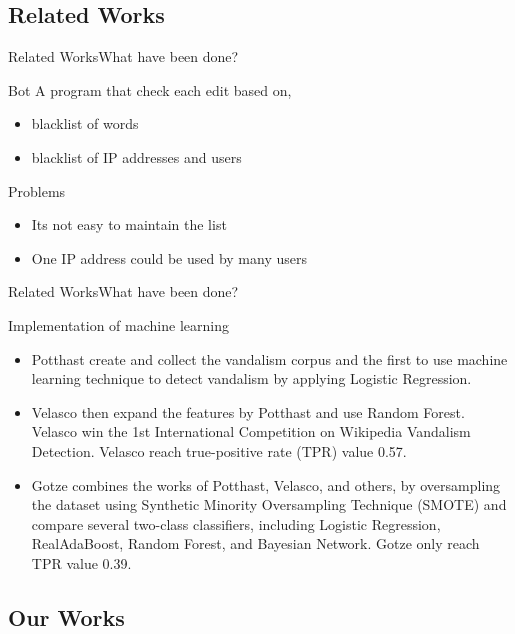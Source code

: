 \documentclass{beamer}
\begin{document}
\subsection{Related Works}

\begin{frame}{Related Works}{What have been done?}
	\begin{block}{Bot}
		A program that check each edit based on,
		\begin{itemize}
		\item blacklist of words
		\item blacklist of IP addresses and users
		\end{itemize}
	\end{block}
	\pause
	\begin{alertblock}{Problems}
		\begin{itemize}
		\item Its not easy to maintain the list
		\item One IP address could be used by many users
		\end{itemize}
	\end{alertblock}
\end{frame}

\begin{frame}{Related Works}{What have been done?}
	\begin{block}{Implementation of machine learning}
		\begin{itemize}
		\item Potthast create and collect the vandalism corpus and the first to
		use machine learning technique to detect vandalism by applying Logistic
		Regression.
		\item Velasco then expand the features by Potthast and use Random
		Forest. Velasco win the 1st International Competition on Wikipedia
		Vandalism Detection. Velasco reach true-positive rate (TPR) value 0.57.
		\item Gotze combines the works of Potthast, Velasco, and others,
		by oversampling the dataset using Synthetic Minority Oversampling
		Technique (SMOTE) and compare several two-class classifiers, including
		Logistic Regression, RealAdaBoost, Random Forest, and Bayesian Network.
		Gotze only reach TPR value 0.39.
		\end{itemize}
	\end{block}
\end{frame}

\subsection{Our Works}
\end{document}
